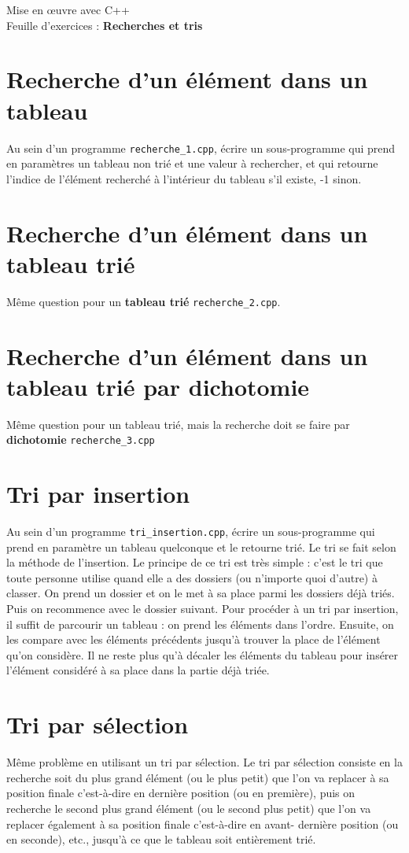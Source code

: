 \documentclass[french]{article}
\begin{document}
	
	\begin{minipage}{\textwidth}
\begin{center}

{\Large Mise en œuvre avec C++ \\ Feuille d'exercices : \textbf{Recherches et tris}}
\end{center}
	\end{minipage}

\section{Recherche d'un élément dans un tableau}

	Au sein d’un programme \texttt{recherche\_1.cpp}, écrire un sous-programme qui prend en paramètres un tableau non trié et une valeur à rechercher, et qui retourne l’indice de l’élément recherché à l’intérieur du tableau s’il existe, -1 sinon.
\section{Recherche d'un élément dans un tableau trié}
	Même question pour un \textbf{tableau trié} \texttt{recherche\_2.cpp}.
	\section{Recherche d'un élément dans un tableau trié par dichotomie}
	Même question pour un tableau trié, mais la recherche doit se faire par \textbf{dichotomie} \texttt{recherche\_3.cpp}
\section{Tri par insertion}
Au sein d’un programme \texttt{tri\_insertion.cpp}, écrire un sous-programme qui prend en paramètre un tableau quelconque et le retourne trié. Le tri se fait selon la méthode de l’insertion. Le principe de ce tri est très simple : c'est le tri que toute personne utilise quand elle a des dossiers (ou n'importe quoi d'autre) à classer. On prend un dossier et on le met à sa place parmi les dossiers déjà triés. Puis on recommence avec le dossier suivant. Pour procéder à un tri par insertion, il suffit de parcourir un tableau : on prend les éléments dans l'ordre. Ensuite, on les compare avec les éléments précédents jusqu'à trouver la place de l'élément qu'on considère. Il ne reste plus qu'à décaler les éléments du tableau pour insérer l'élément considéré à sa place dans la partie déjà  triée.
\section{Tri par sélection}
Même problème en utilisant un tri par sélection. Le tri par sélection consiste en la recherche soit du plus grand élément (ou le plus petit) que l'on va replacer à sa position finale c'est-à-dire en dernière position (ou en première), puis on recherche le second plus grand élément (ou le second plus petit) que l'on va replacer également à sa position finale c'est-à-dire en avant- dernière position (ou en seconde), etc., jusqu'à ce que le tableau soit entièrement trié.
\end{document}
